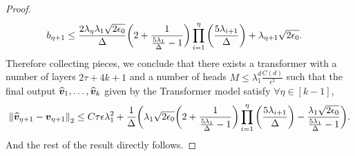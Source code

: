 \begin{proof}
\begin{align*}
        b_{\eta+1}&\leq\frac{2\lambda_{\eta}\lambda_1\sqrt{2\epsilon_0}}{\Delta}{\bigg (} 2+\frac{1}{\frac{5\lambda_1}{\Delta}-1}{\bigg )}\prod_{i=1}^{\eta}{\bigg (}\frac{5\lambda_{i+1}}{\Delta}{\bigg )}+\lambda_{\eta+1}\sqrt{2\epsilon_0}.
    \end{align*}
    Therefore collecting pieces, we conclude that there exists a transformer with a number of layers $2\tau+4k+1$ and a number of heads $M\leq \lambda_1^d\frac{C(d)}{\epsilon^2}$ such that
    the final output $\widehat{\boldsymbol{v}}_1,\ldots,\widehat{\boldsymbol{v}}_{k}$ given by the Transformer model satisfy $\forall \eta\in[k-1]$,
    \begin{align*}
        \left\Vert\widehat{\boldsymbol{v}}_{\eta+1}-\boldsymbol{v}_{\eta+1}\right\Vert_2\leq C\tau \epsilon\lambda_1^2+\frac{1}{\Delta}{\bigg (}\lambda_1\sqrt{2\epsilon_0}{\bigg (} 2+\frac{1}{\frac{5\lambda_1}{\Delta}-1}{\bigg )}\prod_{i=1}^{\eta}{\bigg (}\frac{5\lambda_{i+1}}{\Delta}{\bigg )}-\frac{\lambda_1\sqrt{2\epsilon_0}}{\frac{5\lambda_1}{\Delta}-1}{\bigg )}.
    \end{align*}
    And the rest of the result directly follows.
    \end{proof}

